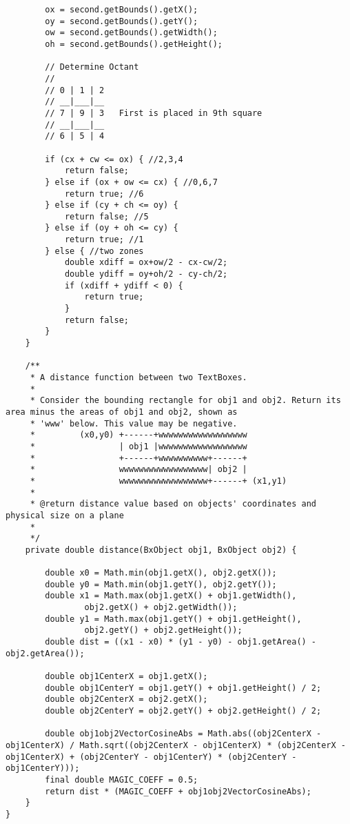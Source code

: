 \begin{appendices}
\begin{lstlisting}
        ox = second.getBounds().getX();
        oy = second.getBounds().getY();
        ow = second.getBounds().getWidth();
        oh = second.getBounds().getHeight();

        // Determine Octant
        //
        // 0 | 1 | 2
        // __|___|__
        // 7 | 9 | 3   First is placed in 9th square
        // __|___|__
        // 6 | 5 | 4

        if (cx + cw <= ox) { //2,3,4
        	return false; 
        } else if (ox + ow <= cx) { //0,6,7
        	return true; //6
        } else if (cy + ch <= oy) {
            return false; //5
        } else if (oy + oh <= cy) {
            return true; //1
        } else { //two zones
            double xdiff = ox+ow/2 - cx-cw/2;
            double ydiff = oy+oh/2 - cy-ch/2;
            if (xdiff + ydiff < 0) {
                return true;
            }
            return false;
        }
    }

    /**
     * A distance function between two TextBoxes.
     *
     * Consider the bounding rectangle for obj1 and obj2. Return its area minus the areas of obj1 and obj2, shown as
     * 'www' below. This value may be negative. 
     *         (x0,y0) +------+wwwwwwwwwwwwwwwwww 
     *                 | obj1 |wwwwwwwwwwwwwwwwww
     *                 +------+wwwwwwwwww+------+
     *                 wwwwwwwwwwwwwwwwww| obj2 |
     *                 wwwwwwwwwwwwwwwwww+------+ (x1,y1)
     *
     * @return distance value based on objects' coordinates and physical size on a plane
     *
     */
    private double distance(BxObject obj1, BxObject obj2) {

        double x0 = Math.min(obj1.getX(), obj2.getX());
        double y0 = Math.min(obj1.getY(), obj2.getY());
        double x1 = Math.max(obj1.getX() + obj1.getWidth(),
                obj2.getX() + obj2.getWidth());
        double y1 = Math.max(obj1.getY() + obj1.getHeight(),
                obj2.getY() + obj2.getHeight());
        double dist = ((x1 - x0) * (y1 - y0) - obj1.getArea() - obj2.getArea());

        double obj1CenterX = obj1.getX();
        double obj1CenterY = obj1.getY() + obj1.getHeight() / 2;
        double obj2CenterX = obj2.getX();
        double obj2CenterY = obj2.getY() + obj2.getHeight() / 2;

        double obj1obj2VectorCosineAbs = Math.abs((obj2CenterX - obj1CenterX) / Math.sqrt((obj2CenterX - obj1CenterX) * (obj2CenterX - obj1CenterX) + (obj2CenterY - obj1CenterY) * (obj2CenterY - obj1CenterY)));
        final double MAGIC_COEFF = 0.5;
        return dist * (MAGIC_COEFF + obj1obj2VectorCosineAbs);
    }
}
\end{lstlisting}

\end{appendices}